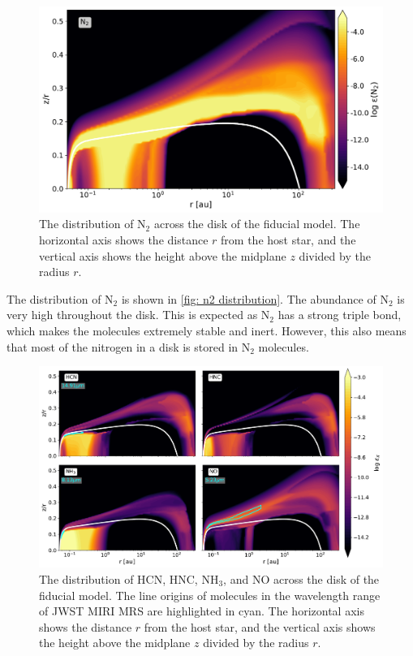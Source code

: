\documentclass[oneside, single, authoryear, semicolon, 12pt]{lion-msc}
\newcommand{\4}{$_4$}
\newcommand{\3}{$_3$}
\newcommand{\2}{$_2$}
\begin{document}
\begin{figure}[H]
    \centering
    \includegraphics[width=.8\linewidth]{Figures/AbundanceN2.pdf}
    \caption{The distribution of N\2 across the disk of the fiducial model. The horizontal axis shows the distance $r$ from the host star, and the vertical axis shows the height above the midplane $z$ divided by the radius $r$.}
    \label{fig: n2 distribution}
\end{figure}

The distribution of N\2 is shown in \autoref{fig: n2 distribution}. The abundance of N\2 is very high throughout the disk. This is expected as N\2 has a strong triple bond, which makes the molecules extremely stable and inert. However, this also means that most of the nitrogen in a disk is stored in N\2 molecules. 

\begin{figure}[H]
    \centering
    \includegraphics[width=\linewidth]{Figures/Abundance2.pdf}
    \caption{The distribution of HCN, HNC, NH\3, and NO across the disk of the fiducial model. The line origins of molecules in the wavelength range of JWST MIRI MRS are highlighted in cyan. The horizontal axis shows the distance $r$ from the host star, and the vertical axis shows the height above the midplane $z$ divided by the radius $r$.}
    \label{fig: nitrogen distribution}
\end{figure}
\end{document}
